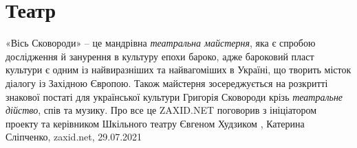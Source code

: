  
 
 
 
 
\chapter{Театр}
\label{sec:slova.teatr}

«Вісь Сковороди» – це мандрівна \emph{театральна майстерня}, яка є спробою дослідження
й занурення в культуру епохи бароко, адже бароковий пласт культури є одним із
найвиразніших та найвагоміших в Україні, що творить місток діалогу із Західною
Європою. Також майстерня зосереджується на розкритті знакової постаті для
української культури Григорія Сковороди крізь \emph{театральне дійство}, спів та
музику.  Про все це ZAXID.NET поговорив з ініціатором проекту та керівником
Шкільного театру Євгеном Худзиком
, 
Катерина Сліпченко, zaxid.net, 29.07.2021
